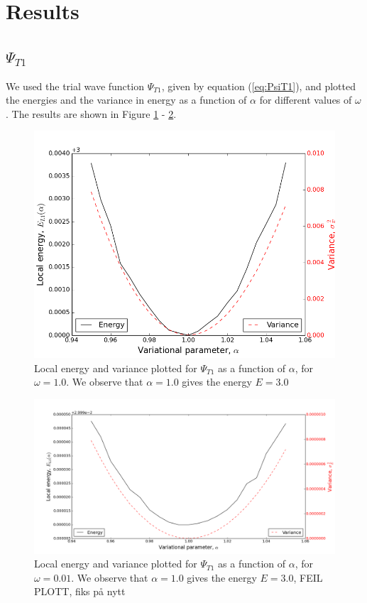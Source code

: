 \documentclass[norsk,a4paper,12pt]{article}
\begin{document}
\section{Results}
\subsection{$\Psi_{T1}$}

We used the trial wave function $\Psi_{T1}$, given by equation (\ref{eq:PsiT1}), and plotted the energies and the variance in energy as a function of $\alpha$ for different values of $\omega$. The results are shown in Figure \ref{fig:E_L1_file_omega=1_0} - \ref{fig:E_L1_file_omega=0_01}.

\begin{figure} [H]
    \centering
    \includegraphics[scale=0.65]{E_L1_variance_omega=1_0}
    \caption{Local energy and variance plotted  for $\Psi_{T1}$ as a function of $\alpha$, for $\omega = 1.0$. We observe that $\alpha = 1.0$ gives the energy $E=3.0$ }
    \label{fig:E_L1_file_omega=1_0}
\end{figure}


\begin{figure} [H]
    \centering
    \includegraphics[scale=0.65]{E_L1_variance_omega=0_01}
    \caption{Local energy and variance plotted  for $\Psi_{T1}$ as a function of $\alpha$, for $\omega = 0.01$. We observe that $\alpha = 1.0$ gives the energy $E=3.0$, FEIL PLOTT, fiks på nytt }
    \label{fig:E_L1_file_omega=0_01}
\end{figure}
\end{document}
